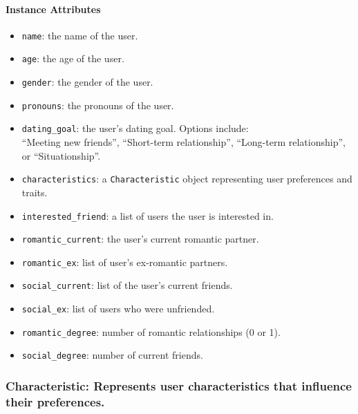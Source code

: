\documentclass[fontsize=11pt]{article}
\begin{document}
\paragraph{Instance Attributes}
\begin{itemize}
    \item \texttt{name}: the name of the user.
    \item \texttt{age}: the age of the user.
    \item \texttt{gender}: the gender of the user.
    \item \texttt{pronouns}: the pronouns of the user.
    \item \texttt{dating\_goal}: the user's dating goal. Options include: \\
    ``Meeting new friends'', ``Short-term relationship'', ``Long-term relationship'', or ``Situationship''.
    \item \texttt{characteristics}: a \texttt{Characteristic} object representing user preferences and traits.
    \item \texttt{interested\_friend}: a list of users the user is interested in.
    \item \texttt{romantic\_current}: the user's current romantic partner.
    \item \texttt{romantic\_ex}: list of user's ex-romantic partners.
    \item \texttt{social\_current}: list of the user's current friends.
    \item \texttt{social\_ex}: list of users who were unfriended.
    \item \texttt{romantic\_degree}: number of romantic relationships (0 or 1).
    \item \texttt{social\_degree}: number of current friends.
\end{itemize}

\subsubsection*{Characteristic: Represents user characteristics that influence their preferences.}
\end{document}
